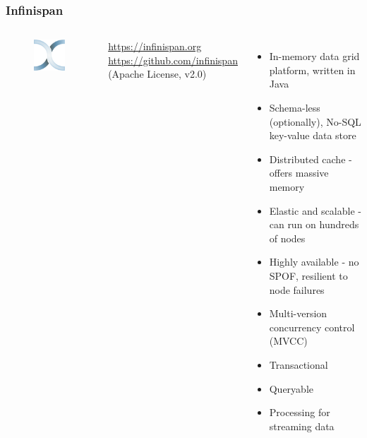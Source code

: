 \documentclass[10pt,utf8]{beamer}
\begin{document}
\begin{frame}
	\frametitle{Infinispan}
	\begin{columns}
		\begin{figure}
			\centering
			\includegraphics[width=3cm]{./img/infinispan.eps}
		\end{figure}
		\vspace{0.38cm}
		\color{blue}
			\url{https://infinispan.org}\\
			\vspace{0.1cm}
			\scriptsize{\url{https://github.com/infinispan}}\\
		\color{black}
		\scriptsize{(Apache License, v2.0)}
		\begin{itemize}
			\item In-memory data grid platform, written in Java
			\item Schema-less (optionally), No-SQL key-value data store
			\item Distributed cache - offers massive memory
			\item Elastic and scalable - can run on hundreds of nodes
			\item Highly available - no SPOF, resilient to node failures
			\item Multi-version concurrency control (MVCC)
			\item Transactional
			\item Queryable
			\item Processing for streaming data
		\end{itemize}
	\end{columns}
\end{frame}
\end{document}
